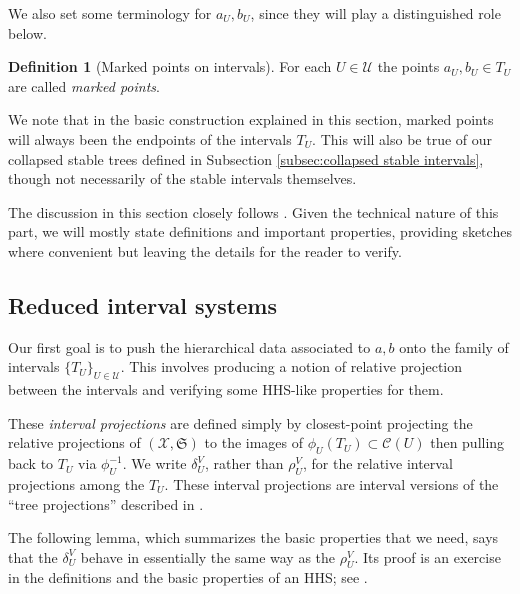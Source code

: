 \documentclass{amsart}
\theoremstyle{definition}
\newtheorem{definition}[theorem]{Definition}
\theoremstyle{remark}
\theoremstyle{definition}
\newcommand{\calC}{\mathcal{C}}
\newcommand{\calU}{\mathcal{U}}
\newcommand{\calX}{\mathcal{X}}
\begin{document}
We also set some terminology for $a_U,b_U$, since they will play a distinguished role below. 

\begin{definition}[Marked points on intervals] \label{defn:marked}
For each $U\in \calU$ the points $a_U, b_U \in T_U$ are called \emph{marked points}.
\end{definition}

We note that in the basic construction explained in this section, marked points will always been the endpoints of the intervals $T_U$.  This will also be true of our collapsed stable trees defined in Subsection \ref{subsec:collapsed stable intervals}, though not necessarily of the stable intervals themselves.

The discussion in this section closely follows \cite[Sections 6 and 7]{Dur_infcube}. Given the technical nature of this part, we will mostly state definitions and important properties, providing sketches where convenient but leaving the details for the reader to verify.

\subsection{Reduced interval systems} \label{subsec:reduced interval systems}

Our first goal is to push the hierarchical data associated to $a,b$ onto the family of intervals $\{T_U\}_{U \in \calU}$.  This involves producing a notion of relative projection between the intervals and verifying some HHS-like properties for them.

These \emph{interval projections} are defined simply by closest-point projecting the relative projections of $(\calX,\mathfrak S)$ to the images of $\phi_U(T_U) \subset \calC(U)$ then pulling back to $T_U$ via $\phi^{-1}_U$.  We write $\delta^V_U$, rather than $\rho^V_U$, for the relative interval projections among the $T_U$.  These interval projections are interval versions of the ``tree projections'' described in \cite[Section 6]{Dur_infcube}.

The following lemma, which summarizes the basic properties that we need, says that the $\delta^V_U$ behave in essentially the same way as the $\rho^V_U$.  Its proof is an exercise in the definitions and the basic properties of an HHS; see \cite[Lemma 6.13]{Dur_infcube}.
\end{document}

